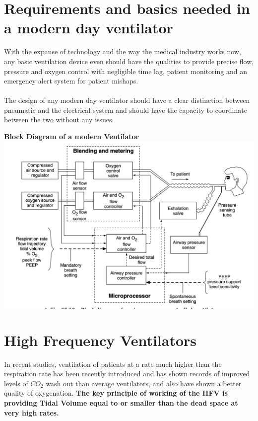 \documentclass{article}
\begin{document}
\section{Requirements and basics needed in a modern day ventilator}
With the expanse of technology and the way the medical industry works now, any basic ventilation device even should have the qualities to provide precise flow, pressure and oxygen control with negligible time lag, patient monitoring and an emergency alert system for patient mishaps.\\\\
The design of any modern day ventilator should have a clear distinction between pneumatic and the electrical system and should have the capacity to coordinate between the two without any issues.\\
\newpage
\begin{center}
    \textbf{Block Diagram of a modern Ventilator}\\
\includegraphics[scale = 0.5]{BlockDiagram.png}\\
\end{center}
\section{High Frequency Ventilators}
In recent studies, ventilation of patients at a rate much higher than the respiration rate has been recently introduced and has shown records of improved levels of $CO_2$ wash out than average ventilators, and also have shown a better quality of oxygenation. \textbf{The key principle of working of the HFV is providing Tidal Volume equal to or smaller than the dead space at very high rates.}
\end{document}
